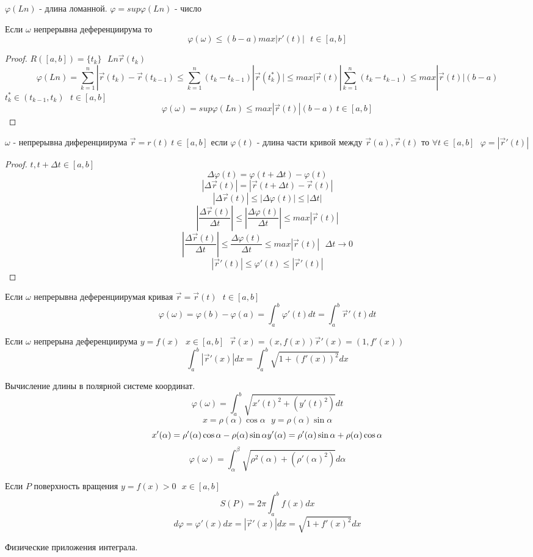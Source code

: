 $\varphi (Ln)$ - длина ломанной. $\varphi = sup \varphi (Ln)$ - число

\begin{theorem}
  Если $\omega$ непрерывна деференциирума то
  $$
  \varphi (\omega) \le (b-a) max |r'(t)| ~~~ t \in [a,b]
  $$
\end{theorem}

\begin{proof}
  $
  R([a,b]) = \{t_k\} ~~~ Ln \vec r (t_k)
  $
  $$
  \varphi (Ln) = \sum_{k=1}^n |\vec r (t_k) - \vec r (t_{k-1}) \le
  \sum_{k=1}^n (t_k - t_{k-1}) |\vec r (t_k^*)| \le max |\vec r (t)|
  \sum_{k=1}^n (t_k - t_{k-1}) \le max |\vec r (t)| (b-a)
  $$
  $t_k^* \in (t_{k-1}, t_k) ~~~ t \in [a,b]$
  $$
  \varphi (\omega) = sup \varphi (Ln) \le max |\vec r (t)|(b-a) ~ t \in [a,b]
  $$
\end{proof}

\begin{theorem}
  $\omega$ - непрерывна диференциирума $\vec r = r(t) ~ t \in [a,b]$ если
  $\varphi (t)$ - длина части кривой между $\vec r(a), \vec r(t)$ то
  $\forall t \in [a,b] ~~~ \varphi = |\vec r'(t)|$
\end{theorem}

\begin{proof}
  $t, t+\Delta t \in [a,b]$
  $$
  \Delta \varphi (t) = \varphi( t+\Delta t) - \varphi(t)
  $$
  $$
  |\Delta \vec r(t) | = |\vec r(t+\Delta t) - \vec r(t)|
  $$
  $$
  |\Delta \vec r(t)| \le |\Delta \varphi (t)| \le |\Delta t|
  $$
  $$
  \left| \frac{\Delta \vec r(t)}{\Delta t} \right| \le
  \left| \frac{\Delta \varphi (t)}{\Delta t} \right| \le
  max |\vec r(t)|
  $$
  $$
  \left| \frac{\Delta \vec r(t)}{\Delta t} \right| \le
  \frac{\Delta \varphi (t)}{\Delta t} \le
  max |\vec r(t)| ~~~ \Delta t \to 0
  $$
  $$
  |\vec r'(t)| \le \varphi'(t) \le |\vec r'(t)|
  $$
\end{proof}

  Если $\omega$ непрерывна деференциирумая кривая
$\vec r = \vec r(t) ~~~ t \in [a,b]$
$$
\varphi (\omega) = \varphi(b) - \varphi(a) =
\int_a^b \varphi'(t)dt =
\int_a^b \vec r'(t)dt
$$

  Если $\omega$ непрерына деференциирума $y = f(x) ~~~ x \in [a,b] ~~~
\vec r(x) = (x, f(x)) \vec r'(x) = (1, f'(x))$
$$
\int_a^b |\vec r'(x)|dx = \int_a^b \sqrt{1 + (f'(x))^2}dx
$$

  Вычисление длины в полярной системе координат.
$$
\varphi (\omega) = \int_a^b \sqrt{x'(t)^2 + (y'(t)^2)}dt
$$
$$
x = \rho (\alpha) \cos \alpha ~~~ y = \rho (\alpha) \sin \alpha
$$
$$
x'(\alpha) = \rho'(\alpha) \cos \alpha - \rho(\alpha) \sin \alpha \\
y'(\alpha) = \rho'(\alpha) \sin \alpha + \rho(\alpha) \cos \alpha
$$
$$
\varphi (\omega) = \int_{\alpha}^{\beta}
\sqrt{\rho^2 (\alpha) + (\rho'(\alpha)^2)} d\alpha
$$

  Если $P$ поверхность вращения $y=f(x) > 0 ~~~ x \in [a,b]$
$$
S(P) = 2\pi \int_a^b f(x)dx
$$
$$
d\varphi = \varphi' (x)dx = |\vec r'(x)|dx = \sqrt{1+f'(x)^2}dx
$$

\begin{title}[\Large]
  Физические приложения интеграла.
\end{title}

